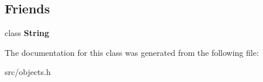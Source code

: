 \subsection*{Friends}
\begin{DoxyCompactItemize}
\item 
\hypertarget{classv8_1_1internal_1_1_string_1_1_flat_content_a7fb804f7dc96dd9f705c84095f37f1ca}{}class {\bfseries String}\label{classv8_1_1internal_1_1_string_1_1_flat_content_a7fb804f7dc96dd9f705c84095f37f1ca}

\end{DoxyCompactItemize}


The documentation for this class was generated from the following file\+:\begin{DoxyCompactItemize}
\item 
src/objects.\+h\end{DoxyCompactItemize}
